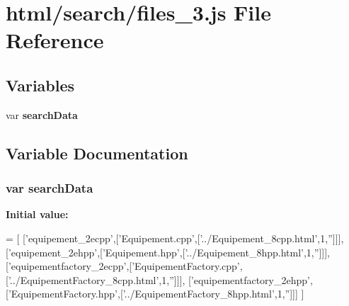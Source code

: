 \section{html/search/files\-\_\-3.js File Reference}
\label{files__3_8js}
\subsection*{Variables}
\begin{DoxyCompactItemize}
\item 
var {\bf search\-Data}
\end{DoxyCompactItemize}


\subsection{Variable Documentation}
\subsubsection[{search\-Data}]{\setlength{\rightskip}{0pt plus 5cm}var search\-Data}\label{files__3_8js_ad01a7523f103d6242ef9b0451861231e}
{\bfseries Initial value\-:}
\begin{DoxyCode}
=
[
  [\textcolor{stringliteral}{'equipement\_2ecpp'},[\textcolor{stringliteral}{'Equipement.cpp'},[\textcolor{stringliteral}{'../Equipement\_8cpp.html'},1,\textcolor{stringliteral}{''}]]],
  [\textcolor{stringliteral}{'equipement\_2ehpp'},[\textcolor{stringliteral}{'Equipement.hpp'},[\textcolor{stringliteral}{'../Equipement\_8hpp.html'},1,\textcolor{stringliteral}{''}]]],
  [\textcolor{stringliteral}{'equipementfactory\_2ecpp'},[\textcolor{stringliteral}{'EquipementFactory.cpp'},[\textcolor{stringliteral}{'../EquipementFactory\_8cpp.html'},1,\textcolor{stringliteral}{''}]]],
  [\textcolor{stringliteral}{'equipementfactory\_2ehpp'},[\textcolor{stringliteral}{'EquipementFactory.hpp'},[\textcolor{stringliteral}{'../EquipementFactory\_8hpp.html'},1,\textcolor{stringliteral}{''}]]]
]
\end{DoxyCode}
